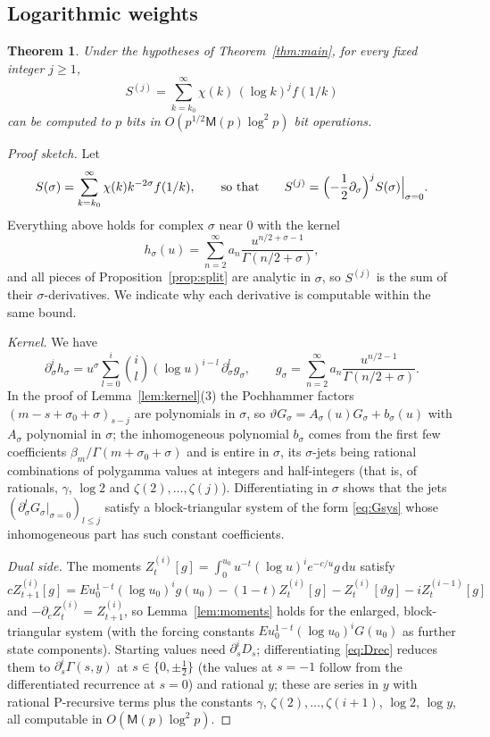 \documentclass[11pt,reqno]{amsart}
\newtheorem{theorem}{Theorem}[section]
\theoremstyle{definition}
\theoremstyle{remark}
\newcommand{\dd}{\,\mathrm{d}}
\newcommand{\Mul}{\mathsf{M}}
\begin{document}
\subsection{Logarithmic weights}

\begin{theorem}\label{thm:log}
Under the hypotheses of Theorem~\ref{thm:main}, for every fixed integer $j \ge 1$,
\[
  S^{(j)} = \sum_{k=k_0}^{\infty}\chi(k)\,(\log k)^j f(1/k)
\]
can be computed to $p$ bits in $O(p^{1/2}\Mul(p)\log^2p)$ bit operations.
\end{theorem}

\begin{proof}[Proof sketch]
Let
\[
  S(\sigma) = \sum_{k=k_0}^{\infty} \chi(k) k^{-2\sigma} f(1/k), \qquad\text{so that}\qquad
  S^{(j)} = \Bigl(-\frac12\partial_\sigma\Bigr)^jS(\sigma)\Big|_{\sigma=0}.
\]
Everything above holds for complex $\sigma$ near $0$ with the kernel
\[
  h_\sigma(u) = \sum_{n=2}^{\infty} a_n \frac{u^{n/2+\sigma-1}}{\Gamma(n/2+\sigma)},
\]
and all pieces of Proposition~\ref{prop:split}
are analytic in $\sigma$, so $S^{(j)}$ is the sum of their $\sigma$-derivatives. We indicate why each derivative
is computable within the same bound.

\emph{Kernel.} We have
\[
  \partial_\sigma^i h_\sigma = u^\sigma\sum_{l=0}^{i}\binom il (\log u)^{i-l}\, \partial_\sigma^l g_\sigma, \qquad
  g_\sigma = \sum_{n=2}^{\infty} a_n \frac{u^{n/2-1}}{\Gamma(n/2+\sigma)}.
\]
In the proof of
Lemma~\ref{lem:kernel}(3) the Pochhammer factors $(m - s + \sigma_0 + \sigma)_{s-j}$ are polynomials in $\sigma$, so
$\vartheta G_\sigma = A_\sigma(u)G_\sigma + b_\sigma(u)$ with $A_\sigma$ polynomial in $\sigma$; the inhomogeneous polynomial $b_\sigma$
comes from the first few coefficients $\beta_m/\Gamma(m+\sigma_0+\sigma)$ and is entire in $\sigma$, its $\sigma$-jets being
rational combinations of polygamma values at integers and half-integers (that is, of rationals, $\gamma$, $\log2$ and
$\zeta(2), \dots, \zeta(j)$). Differentiating in $\sigma$ shows that the jets $(\partial_\sigma^lG_\sigma|_{\sigma=0})_{l\le j}$
satisfy a block-triangular system of the form \eqref{eq:Gsys} whose inhomogeneous part has such constant coefficients.

\emph{Dual side.} The moments $Z^{(i)}_t[g] = \int_0^{u_0}u^{-t}(\log u)^ie^{-c/u}g\dd u$ satisfy
\[
  c Z^{(i)}_{t+1}[g] = E u_0^{1-t}(\log u_0)^i g(u_0) - (1-t)Z^{(i)}_t[g] - Z^{(i)}_t[\vartheta g] - iZ^{(i-1)}_t[g]
\]
and $-\partial_c Z^{(i)}_t = Z^{(i)}_{t+1}$, so Lemma~\ref{lem:moments} holds for the enlarged, block-triangular
system (with the forcing constants $E u_0^{1-t}(\log u_0)^i G(u_0)$ as further state components). Starting values need
$\partial_s^iD_s$; differentiating \eqref{eq:Drec} reduces them to $\partial_s^i\Gamma(s, y)$ at $s \in \{0, \pm\frac12\}$
(the values at $s = -1$ follow from the differentiated recurrence at $s = 0$) and rational $y$; these are series in $y$ with rational
P-recursive terms plus the constants $\gamma$, $\zeta(2), \dots, \zeta(i+1)$, $\log 2$, $\log y$, all computable in
$O(\Mul(p)\log^2 p)$.


\end{proof}
\end{document}
